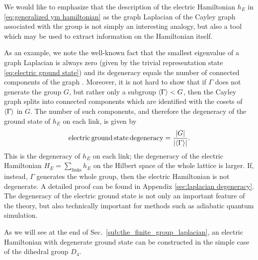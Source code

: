 \medskip

We would like to emphasize that the description of the electric Hamiltonian $h_E$ in \eqref{eq:generalized ym hamiltonian} as the graph Laplacian of the Cayley graph associated with the group is not simply an interesting analogy, but also a tool which may be used to extract information on the Hamiltonian itself.

As an example, we note the well-known fact that the smallest eigenvalue of a graph Laplacian is always zero (given by the trivial representation state \eqref{eq:electric ground state}) and its degeneracy equals the number of connected components of the graph \cite{spectralgraphtheory}.
Moreover, it is not hard to show that if $\Gamma$ does not generate the group $G$, but rather only a subgroup $\expval{\Gamma} < G$, then the Cayley graph splits into connected components which are identified with the cosets of $\expval{\Gamma}$ in $G$.
The number of such components, and therefore the degeneracy of the ground state of $h_E$ on each link, is given by
\begin{equation}
    \mathrm{electric\,ground\,state\,degeneracy}=\frac{\abs{G}}{\abs{\expval{\Gamma}}}.
\end{equation}
This is the degeneracy of $h_E$ on each link; the degeneracy of the electric Hamiltonian $H_E = \sum_{\mathrm{links}} h_E$ on the Hilbert space of the whole lattice is larger.
If, instead, $\Gamma$ generates the whole group, then the electric Hamiltonian is not degenerate.
A detailed proof can be found in Appendix \ref{sec:laplacian degeneracy}.
The degeneracy of the electric ground state is not only an important feature of the theory, but also technically important for methods such as adiabatic quantum simulation.

As we will see at the end of Sec.~\ref{sub:the_finite_group_laplacian}, an electric Hamiltonian with degenerate ground state can be constructed in the simple case of the dihedral group $D_4$.



